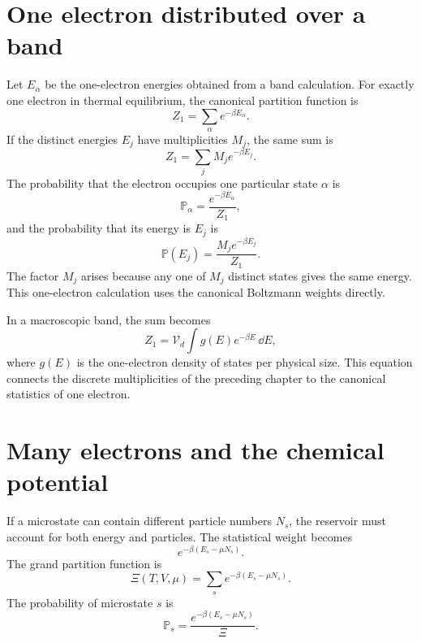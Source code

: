 \section{One electron distributed over a band}

Let $E_\alpha$ be the one-electron energies obtained from a band calculation.
For exactly one electron in thermal equilibrium, the canonical partition
function is
\begin{equation}
  Z_1=\sum_\alpha e^{-\beta E_\alpha}.
  \label{eq:single-electron-band-partition-function}
\end{equation}
If the distinct energies $E_j$ have multiplicities $M_j$, the same sum is
\begin{equation}
  Z_1=\sum_jM_je^{-\beta E_j}.
  \label{eq:single-electron-partition-with-multiplicity}
\end{equation}
The probability that the electron occupies one particular state $\alpha$ is
\begin{equation}
  \mathbb P_\alpha
  =\frac{e^{-\beta E_\alpha}}{Z_1},
  \label{eq:single-electron-canonical-state-probability}
\end{equation}
and the probability that its energy is $E_j$ is
\begin{equation}
  \mathbb P(E_j)
  =\frac{M_je^{-\beta E_j}}{Z_1}.
  \label{eq:single-electron-energy-probability-multiplicity}
\end{equation}
The factor $M_j$ arises because any one of $M_j$ distinct states gives the same
energy.  This one-electron calculation uses the canonical Boltzmann weights directly.

In a macroscopic band, the sum becomes
\begin{equation}
  Z_1
  =\mathcal V_d\int g(E)e^{-\beta E}\,\dd E,
  \label{eq:single-electron-partition-dos-integral}
\end{equation}
where $g(E)$ is the one-electron density of states per physical size.  This
equation connects the discrete multiplicities of the preceding chapter to the
canonical statistics of one electron.

\section{Many electrons and the chemical potential}

If a microstate can contain different particle numbers $N_s$, the reservoir
must account for both energy and particles.  The statistical weight becomes
\begin{equation}
  e^{-\beta(E_s-\mu N_s)}.
  \label{eq:grand-canonical-weight}
\end{equation}
The grand partition function is
\begin{equation}
  \boxed{
  \Xi(T,V,\mu)
  =\sum_s e^{-\beta(E_s-\mu N_s)}.
  }
  \label{eq:grand-partition-function}
\end{equation}
The probability of microstate $s$ is
\begin{equation}
  \mathbb P_s
  =\frac{e^{-\beta(E_s-\mu N_s)}}{\Xi}.
  \label{eq:grand-canonical-probability}
\end{equation}

